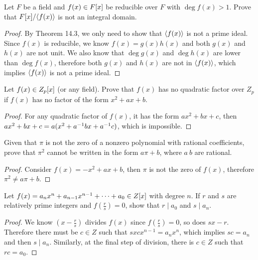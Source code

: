 \documentclass[../main.tex]{subfiles}
\begin{document}
\begin{exercise}
  Let $F$ be a field and $f(x) \in F[x]$ be reducible over $F$
  with $\deg f(x) > 1$. Prove that $F[x]/\langle f(x) \rangle$ is not an integral domain.
\end{exercise}
\begin{proof}
  By Theorem 14.3, we only need to show that $\langle f(x) \rangle$ is not a prime ideal.
  Since $f(x)$ is reducible, we know $f(x) = g(x)h(x)$ and both $g(x)$ and $h(x)$
  are not unit.
  We also know that $\deg g(x)$ and $\deg h(x)$ are lower than $\deg f(x)$,
  therefore both $g(x)$ and $h(x)$ are not in $\langle f(x) \rangle$, which implies
  $\langle f(x) \rangle$ is not a prime ideal.
\end{proof}

\setcounter{exercise}{31}
\begin{exercise}
  Let $f(x) \in Z_p[x]$ (or any field). Prove that $f(x)$ has no quadratic
  factor over $Z_p$ if $f(x)$ has no factor of the form $x^2 + ax + b$.
\end{exercise}
\begin{proof}
  For any quadratic factor of $f(x)$, it has the form $ax^2 + bx + c$,
  then $ax^2 + bx + c = a(x^2 + a^{-1}bx + a^{-1}c)$, which is impossible.
\end{proof}

\setcounter{exercise}{33}
\begin{exercise}
  Given that $\pi$ is not the zero of a nonzero polynomial with rational coefficients,
  prove that $\pi^2$ cannot be written in the form $a\pi + b$, where $a \ b$ are rational.
\end{exercise}
\begin{proof}
  Consider $f(x) = - x^2 + ax + b$, then $\pi$ is not the zero of $f(x)$,
  therefore $\pi^2 \neq a\pi + b$.
\end{proof}

\begin{exercise}
  Let $f(x) = a_nx^n + a_{n - 1}x^{n - 1} + \dots + a_0 \in Z[x]$ with degree $n$.
  If $r$ and $s$ are relatively prime integers and $f(\frac{r}{s}) = 0$,
  show that $r \mid a_0$ and $s \mid a_n$.
\end{exercise}
\begin{proof}
  We know $(x - \frac{r}{s})$ divides $f(x)$ since $f(\frac{r}{s}) = 0$,
  so does $sx - r$. Therefore there must be $c \in Z$ such that $sxcx^{n - 1} = a_nx^n$,
  which implies $sc = a_n$ and then $s \mid a_n$.
  Similarly, at the final step of division, there is $c \in Z$ such that $rc = a_0$.
\end{proof}
\end{document}
